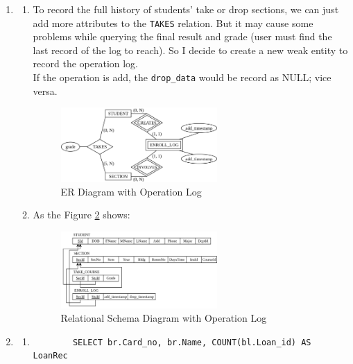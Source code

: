 \documentclass[12pt,a4paper]{article}
\begin{document}
\begin{enumerate}
\begin{enumerate}
    \end{enumerate}
    \item \begin{enumerate}
        \item To record the full history of students' take or drop sections, we can just add more attributes to the \texttt{TAKES} relation. But it may cause some problems while querying the final result and grade (user must find the last record of the log to reach). So I decide to create a new weak entity to record the operation log.\\
        If the operation is add, the \texttt{drop\_data} would be record as NULL; vice versa.\\
        \begin{figure}[H]
            \centering
            \includegraphics[width=0.6\textwidth]{src/2A.png}
            \caption{ER Diagram with Operation Log}
            \label{fig:ER_diagram_with_log}
        \end{figure}
        \item As the Figure \ref{fig:ER_diagram_with_advisor} shows:
        \begin{figure}[H]
            \centering
            \includegraphics[width=0.6\textwidth]{src/2B.png}
            \caption{Relational Schema Diagram with Operation Log}
            \label{fig:ER_diagram_with_advisor}
        \end{figure}
    \end{enumerate}
    \item 
    \begin{enumerate}
        \item
        \begin{verbatim}
        SELECT br.Card_no, br.Name, COUNT(bl.Loan_id) AS LoanRec

\end{verbatim}
\end{enumerate}
\end{enumerate}
\end{document}
